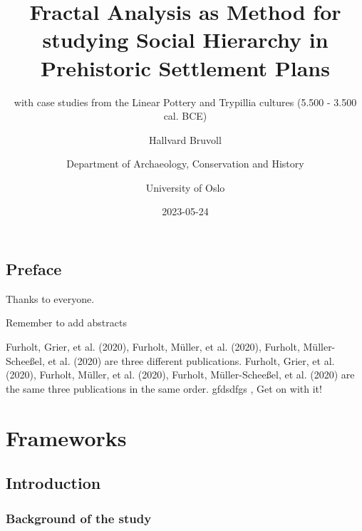 \documentclass[
  12pt,
]{book}
\title{Fractal Analysis as Method for studying Social Hierarchy in Prehistoric Settlement Plans}
\subtitle{with case studies from the Linear Pottery and Trypillia cultures (5.500 - 3.500 cal. BCE)}
\author{Hallvard Bruvoll \and Department of Archaeology, Conservation and History \and University of Oslo}
\date{2023-05-24}
\begin{document}
\maketitle

{
\setcounter{tocdepth}{1}
\tableofcontents
}
\hypertarget{preface}{%
\chapter*{Preface}\label{preface}}

Thanks to everyone.

Remember to add abstracts

Furholt, Grier, et al. (2020), Furholt, Müller, et al. (2020), Furholt, Müller-Scheeßel, et al. (2020) are three different publications. Furholt, Grier, et al. (2020), Furholt, Müller, et al. (2020), Furholt, Müller-Scheeßel, et al. (2020) are the same three publications in the same order. gfdsdfgs , Get on with it!

\hypertarget{part-frameworks}{%
\part{Frameworks}\label{part-frameworks}}

\hypertarget{intro}{%
\chapter{Introduction}\label{intro}}

\hypertarget{background-of-the-study}{%
\section{Background of the study}\label{background-of-the-study}}
\end{document}
